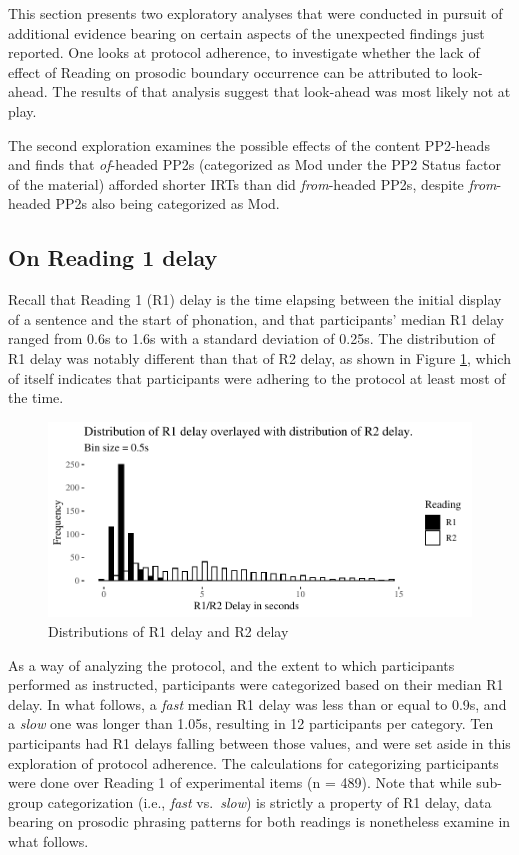 \documentclass[11pt,oneside]{book}
\begin{document}
This section presents two exploratory analyses that were conducted in pursuit of additional evidence bearing on certain aspects of the unexpected findings just reported. One looks at protocol adherence, to investigate whether the lack of effect of Reading on prosodic boundary occurrence can be attributed to look-ahead. The results of that analysis suggest that look-ahead was most likely not at play.

The second exploration examines the possible effects of the content PP2-heads and finds that \emph{of}-headed PP2s (categorized as Mod under the PP2 Status factor of the material) afforded shorter IRTs than did \emph{from}-headed PP2s, despite \emph{from}-headed PP2s also being categorized as Mod.

\hypertarget{r1del}{%
\subsection{On Reading 1 delay}\label{r1del}}

Recall that Reading 1 (R1) delay is the time elapsing between the initial display of a sentence and the start of phonation, and that participants' median R1 delay ranged from 0.6s to 1.6s with a standard deviation of 0.25s. The distribution of R1 delay was notably different than that of R2 delay, as shown in Figure \ref{fig:delayComparison}, which of itself indicates that participants were adhering to the protocol at least most of the time.

\begin{figure}
\centering
\includegraphics{4-results_files/figure-latex/delayComparison-1.pdf}
\caption{\label{fig:delayComparison}Distributions of R1 delay and R2 delay}
\end{figure}

As a way of analyzing the protocol, and the extent to which participants performed as instructed, participants were categorized based on their median R1 delay. In what follows, a \emph{fast} median R1 delay was less than or equal to 0.9s, and a \emph{slow} one was longer than 1.05s, resulting in 12 participants per category. Ten participants had R1 delays falling between those values, and were set aside in this exploration of protocol adherence. The calculations for categorizing participants were done over Reading 1 of experimental items (n = 489). Note that while sub-group categorization (i.e., \emph{fast} vs.~\emph{slow}) is strictly a property of R1 delay, data bearing on prosodic phrasing patterns for both readings is nonetheless examine in what follows.
\end{document}
